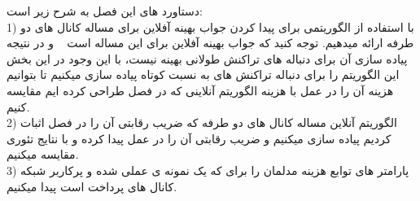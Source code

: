 دستاورد های این فصل به شرح زیر است:\\
1) با استفاده از  الگوریتمی برای پیدا کردن جواب بهینه آفلاین \off برای مساله کانال های دو طرفه ارائه میدهیم. توجه کنید که جواب بهینه آفلاین برای این مساله  است 
~\cite{oracle}
و در نتیجه پیاده سازی آن برای دنباله های تراکنش طولانی بهینه نیست، با این وجود در این بخش این الگوریتم را برای دنباله تراکنش های به نسبت کوتاه پیاده سازی میکنیم تا بتوانیم هزینه آن را در عمل با هزینه الگوریتم آنلاینی که در فصل  طراحی کرده ایم مقایسه کنیم.\\
2) الگوریتم آنلاین مساله کانال های دو طرفه که ضریب رقابتی آن را در فصل  اثبات کردیم پیاده سازی میکنیم و ضریب رقابتی آن را در عمل پیدا کرده و با نتایج تئوری مقایسه میکنیم.\\
3) پارامتر های توابع هزینه مدلمان را برای که یک نمونه ی عملی شده و پرکاربر شبکه کانال های پرداخت است پیدا میکنیم.

